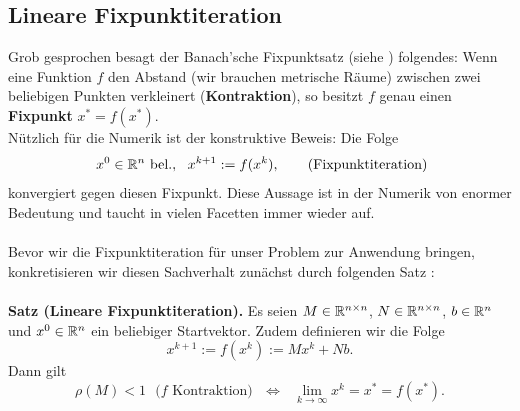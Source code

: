 \subsection{Lineare Fixpunktiteration}
Grob gesprochen besagt der Banach'sche Fixpunktsatz (siehe \cite[Kap. 2.4]{Meister}) folgendes: Wenn eine Funktion $f$ den Abstand (wir brauchen metrische Räume) zwischen zwei beliebigen Punkten verkleinert (\textbf{Kontraktion}), so besitzt $f$ genau einen \textbf{Fixpunkt} $x^* = f(x^*)$.\\
Nützlich für die Numerik ist der konstruktive Beweis: Die Folge 
$$~x^0\in{\mathbb{R}}^{n}~\text{bel.},~~x^{k+1} := f(x^k),~  ~~~~~\text{(Fixpunktiteration)}$$
konvergiert gegen diesen Fixpunkt. Diese Aussage ist in der Numerik von enormer Bedeutung und taucht in vielen Facetten immer wieder auf.\\~\\
Bevor wir die Fixpunktiteration für unser Problem zur Anwendung bringen, konkretisieren wir diesen Sachverhalt zunächst durch folgenden Satz \cite[Satz 4.5]{Meister}:\\~\\
\textbf{Satz (Lineare Fixpunktiteration).} Es seien $M\in {\mathbb{R}}^{n\times n}$, $N\in {\mathbb{R}}^{n\times n}$, $b\in {\mathbb{R}}^{n}$ und $x^0\in{\mathbb{R}}^{n}$ ein beliebiger Startvektor. Zudem definieren wir die Folge $$x^{k+1} := f(x^k) := Mx^k + Nb. $$
Dann gilt 
$$ \rho(M)<1~~~ \text{($f$ Kontraktion)} ~~~\Leftrightarrow~~~\lim_{k \to \infty}x^k =x^* = f(x^*). $$

